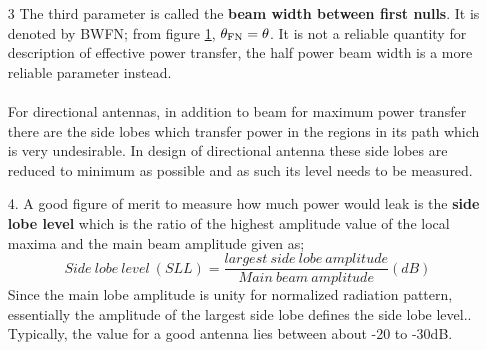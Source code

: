 \begin{enumerate}
	\paragraph{}
	It should be noted that the radiation pattern might not be circular in the H-plane so the effective sector does not form essentially a cone as is the case in the example. So for any shape of radiation pattern which is not a circle different planes are placed at the 3dB points with respect to the maximum point and then we get a HPBW that is varying. We recall that the 3 dimensional radiation pattern can be fully captured by the two principal planes; the E-plane and the H-plane. So for a radiation pattern which is not circular we would get the HPBW for the E-plane and the H-plane i.e. $\theta_{\textnormal{HP}}$ for E-plane and $\theta_{\textnormal{HP}}$ for H-plane. This parameter, the HPBW is a very important parameter and it is also often times called the 3dB beam-width.  
	\paragraph{}
	Also there is a third parameter which answers to the question of what is the effective angle over which the radiation goes? If we accept the variations of electric fields within the sector but provided radiation does not go to zero, the choice would be the first nulls on either sides of the main beam and then the beam width would be $\theta$ from figure\ref{figure11}
	
	\begin{figure}[h]
		\centering
		\texttt{[image: "fig 11 new"]}
		\label{figure11}
	\end{figure}
	
	
	\item[3]The third parameter is called the \textbf{beam width between first nulls}. It is denoted by BWFN; from figure \ref{figure11}, $\theta_\textnormal{FN}=\theta$. It is not a reliable quantity for description of effective power transfer, the half power beam width is a more reliable parameter instead.
	\paragraph{}
	For directional antennas, in addition to beam for maximum power transfer there are the side lobes which transfer power in the regions in its path which is very undesirable. In design of directional antenna these side lobes are reduced to minimum as possible and as such its level needs to be measured.
	\item[4.]A good figure of merit to measure how much power would leak is the \textbf{side lobe level} which is the ratio of the highest amplitude value of the local maxima and the main beam amplitude given as;
	$$ Side\ lobe\ level\ (SLL)=\frac{largest\ side\ lobe\ amplitude}{Main\ beam\ amplitude}(dB)$$
	Since the main lobe amplitude is unity for normalized radiation pattern, essentially the amplitude of the largest side lobe defines the side lobe level.. Typically, the value for a good antenna lies between about -20 to -30dB.

\end{enumerate}
